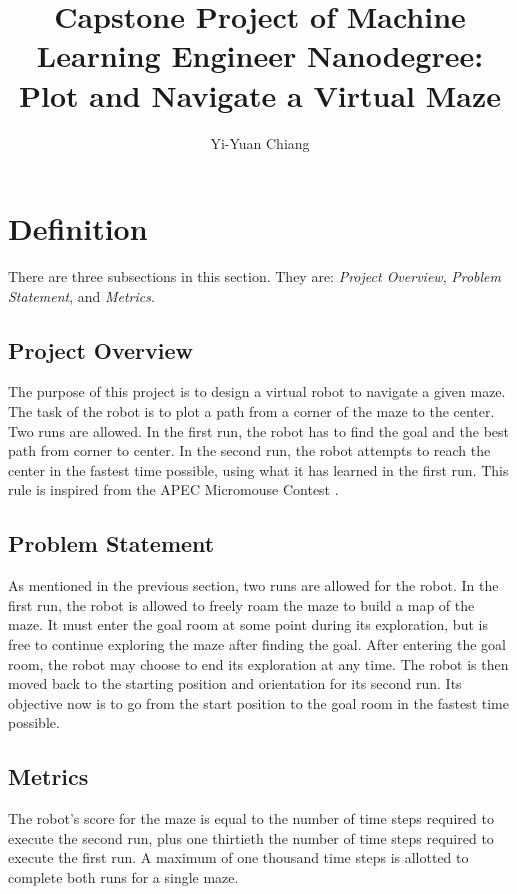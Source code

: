 \documentclass[11pt, oneside]{article}   	%
\begin{document}
\title{Capstone Project of Machine Learning Engineer Nanodegree: Plot and Navigate a Virtual Maze}
\author{Yi-Yuan Chiang}
\maketitle
\section{Definition}
There are three subsections in this section. They are: {\it Project Overview}, {\it Problem Statement}, and {\it Metrics}.

\subsection{Project Overview}
The purpose of this project is to design a virtual robot to navigate a given maze. The task of the robot is to plot a path from a corner of the maze to the center. Two runs are allowed. In the first run, the robot has to find the goal and the best path from corner to center. In the second run, the robot attempts to reach the center in the fastest time possible, using what it has learned in the first run. This rule is inspired from the APEC Micromouse Contest {\cite {apec}}.
\subsection{Problem Statement}
As mentioned in the previous section, two runs are allowed for the robot. In the first run, the robot is allowed to freely roam the maze to build a map of the maze. It must enter the goal room at some point during its exploration, but is free to continue exploring the maze after finding the goal. After entering the goal room, the robot may choose to end its exploration at any time. The robot is then moved back to the starting position and orientation for its second run. Its objective now is to go from the start position to the goal room in the fastest time possible.
\subsection{Metrics}
The robot’s score for the maze is equal to the number of time steps required to execute the second run, plus one thirtieth the number of time steps required to execute the first run. A maximum of one thousand time steps is allotted to complete both runs for a single maze.
\end{document}
